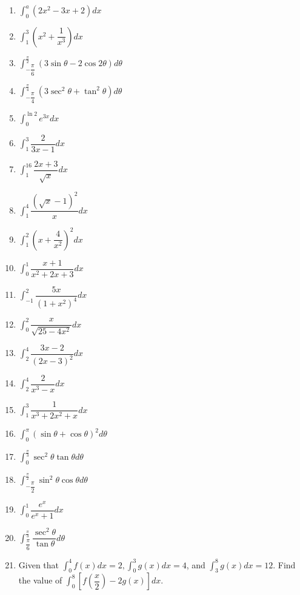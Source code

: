 \documentclass{report}
\begin{document}
\begin{enumerate}
    \item $\displaystyle\int_0^a\left(2 x^2-3 x+2\right) d x$
    \item $\displaystyle\int_1^3\left(x^2+\dfrac{1}{x^3}\right) d x$
    \item $\displaystyle\int_{-\dfrac{\pi}{6}}^{\frac{\pi}{2}}(3 \sin \theta-2 \cos 2 \theta) d \theta$
    \item $\displaystyle\int_{-\dfrac{\pi}{4}}^{\frac{\pi}{4}}\left(3 \sec ^2 \theta+\tan ^2 \theta\right) d \theta$
    \item $\displaystyle\int_0^{\ln 2} e^{3 x} d x$
    \item $\displaystyle\int_1^3 \dfrac{2}{3 x-1} d x$
    \item $\displaystyle\int_1^{16} \dfrac{2 x+3}{\sqrt{x}} d x$
    \item $\displaystyle\int_1^4 \dfrac{(\sqrt{x}-1)^2}{x} d x$
    \item $\displaystyle\int_1^2\left(x+\dfrac{4}{x^2}\right)^2 d x$
    \item $\displaystyle\int_0^1 \dfrac{x+1}{x^2+2 x+3} d x$
    \item $\displaystyle\int_{-1}^2 \dfrac{5 x}{\left(1+x^2\right)^4} d x$
    \item $\displaystyle\int_0^2 \dfrac{x}{\sqrt{25-4 x^2}} d x$
    \item $\displaystyle\int_2^4 \dfrac{3 x-2}{(2 x-3)^2} d x$
    \item $\displaystyle\int_2^4 \dfrac{2}{x^3-x} d x$
    \item $\displaystyle\int_1^3 \dfrac{1}{x^3+2 x^2+x} d x$
    \item $\displaystyle\int_0^\pi(\sin \theta+\cos \theta)^2 d \theta$
    \item $\displaystyle\int_0^{\frac{\pi}{3}} \sec ^2 \theta \tan \theta d \theta$
    \item $\displaystyle\int_{-\dfrac{\pi}{2}}^{\frac{\pi}{2}} \sin ^2 \theta \cos \theta d \theta$
    \item $\displaystyle\int_0^1 \dfrac{e^x}{e^x+1} d x$
    \item $\displaystyle\int_{\dfrac{\pi}{6}}^{\frac{\pi}{3}} \dfrac{\sec ^2 \theta}{\tan \theta} d \theta$
    \item Given that $\displaystyle\int_0^4 f(x) d x=2, \displaystyle\int_0^3 g(x) d
              x=4$, and $\displaystyle\int_3^8 g(x) d x=12$. Find the value of
          $\displaystyle\int_0^8\left[f\left(\dfrac{x}{2}\right)-2 g(x)\right] d x$.

\end{enumerate}
\end{document}
